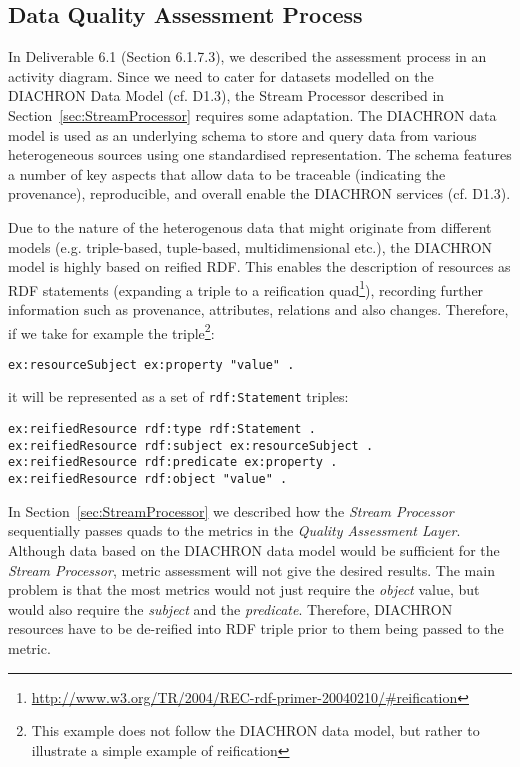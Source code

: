 
\subsection{Data Quality Assessment Process}
\label{sec:DQAssessment} 
In Deliverable 6.1 (Section 6.1.7.3), we described the assessment process in an activity diagram.
Since we need to cater for datasets modelled on the DIACHRON Data Model (cf. D1.3), the Stream Processor described in Section~\ref{sec:StreamProcessor} requires some adaptation.
The DIACHRON data model is used as an underlying schema to store and query data from various heterogeneous sources using one standardised representation.
The schema features a number of key aspects that allow data to be traceable (indicating the provenance), reproducible, and overall enable the DIACHRON services (cf. D1.3).

Due to the nature of the heterogenous data that might originate from different models (e.g. triple-based, tuple-based, multidimensional etc.), the DIACHRON model is highly based on reified RDF.
This enables the description of resources as RDF statements (expanding a triple to a reification quad\footnote{\url{http://www.w3.org/TR/2004/REC-rdf-primer-20040210/#reification}}), recording further information such as provenance, attributes, relations and also changes.
Therefore, if we take for example the triple\footnote{This example does not follow the DIACHRON data model, but rather to illustrate a simple example of reification}:
\begin{lstlisting}[language=N3]
ex:resourceSubject ex:property "value" .
\end{lstlisting}
it will be represented as a set of \texttt{rdf:Statement} triples:
\begin{lstlisting}[language=N3]
ex:reifiedResource rdf:type rdf:Statement .
ex:reifiedResource rdf:subject ex:resourceSubject .
ex:reifiedResource rdf:predicate ex:property .
ex:reifiedResource rdf:object "value" .
\end{lstlisting}

In Section~\ref{sec:StreamProcessor} we described how the \emph{Stream Processor} sequentially passes quads to the metrics in the \emph{Quality Assessment Layer}.
Although data based on the DIACHRON data model would be sufficient for the \emph{Stream Processor}, metric assessment will not give the desired results.
The main problem is that the most metrics would not just require the \emph{object} value, but would also require the \emph{subject} and the \emph{predicate}.
Therefore, DIACHRON resources have to be de-reified into RDF triple prior to them being passed to the metric.

